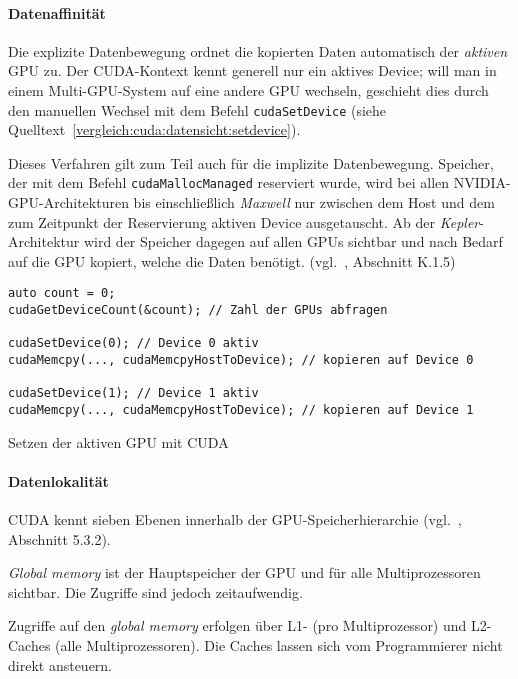 \paragraph{Datenaffinität}

Die explizite Datenbewegung ordnet die kopierten Daten automatisch der
\textit{aktiven} GPU zu. Der CUDA-Kontext kennt generell nur ein aktives Device;
will man in einem Multi-GPU-System auf eine andere GPU wechseln, geschieht dies
durch den manuellen Wechsel mit dem Befehl \texttt{cudaSetDevice} (siehe
Quelltext~\ref{vergleich:cuda:datensicht:setdevice}).

Dieses Verfahren gilt zum Teil auch für die implizite Datenbewegung. Speicher,
der mit dem Befehl \texttt{cudaMallocManaged} reserviert wurde, wird bei allen
NVIDIA-GPU-Architekturen bis einschließlich \textit{Maxwell} nur zwischen dem
Host und dem zum Zeitpunkt der Reservierung aktiven Device ausgetauscht. Ab der
\textit{Kepler}-Architektur wird der Speicher dagegen auf allen GPUs sichtbar
und nach Bedarf auf die GPU kopiert, welche die Daten benötigt.
(vgl.~\cite{cudaguide}, Abschnitt K.1.5)

\begin{code}
    \begin{verbatim}
auto count = 0;
cudaGetDeviceCount(&count); // Zahl der GPUs abfragen

cudaSetDevice(0); // Device 0 aktiv
cudaMemcpy(..., cudaMemcpyHostToDevice); // kopieren auf Device 0

cudaSetDevice(1); // Device 1 aktiv
cudaMemcpy(..., cudaMemcpyHostToDevice); // kopieren auf Device 1
    \end{verbatim}
    \caption{Setzen der aktiven GPU mit CUDA}
    \label{vergleich:cuda:datensicht:setdevice}
\end{code}

\paragraph{Datenlokalität}

CUDA kennt sieben Ebenen innerhalb der GPU-Speicherhierarchie
(vgl.~\cite{cudaguide}, Abschnitt 5.3.2).

\textit{Global memory} ist der Hauptspeicher der GPU und für alle
Multiprozessoren sichtbar. Die Zugriffe sind jedoch zeitaufwendig.

Zugriffe auf den \textit{global memory} erfolgen über L1- (pro Multiprozessor)
und L2-Caches (alle Multiprozessoren). Die Caches lassen sich vom Programmierer
nicht direkt ansteuern.

